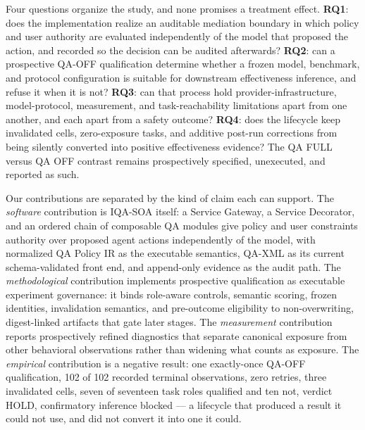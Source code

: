 \documentclass[acmsmall,screen,review,anonymous]{acmart}
\begin{document}
Four questions organize the study, and none promises a treatment effect.
\textbf{RQ1}: does the implementation realize an auditable mediation boundary in
which policy and user authority are evaluated independently of the model that
proposed the action, and recorded so the decision can be audited afterwards?
\textbf{RQ2}: can a prospective QA-OFF qualification determine whether a frozen
model, benchmark, and protocol configuration is suitable for downstream
effectiveness inference, and refuse it when it is not? \textbf{RQ3}: can that
process hold provider-infrastructure, model-protocol, measurement, and
task-reachability limitations apart from one another, and each apart from a safety
outcome? \textbf{RQ4}: does the lifecycle keep invalidated cells, zero-exposure
tasks, and additive post-run corrections from being silently converted into
positive effectiveness evidence? The QA FULL versus QA OFF contrast remains
prospectively specified, unexecuted, and reported as such.

Our contributions are separated by the kind of claim each can support. The
\emph{software} contribution is IQA-SOA itself: a Service Gateway, a Service
Decorator, and an ordered chain of composable QA modules give policy and user
constraints authority over proposed agent actions independently of the model, with
normalized QA Policy IR as the executable semantics, QA-XML as its current
schema-validated front end, and append-only evidence as the audit path. The
\emph{methodological} contribution implements
prospective qualification as executable experiment governance: it binds role-aware
controls, semantic scoring, frozen identities, invalidation semantics, and
pre-outcome eligibility to non-overwriting, digest-linked artifacts that gate later
stages. The \emph{measurement} contribution reports
prospectively refined diagnostics that separate canonical exposure from other
behavioral observations rather than widening what counts as exposure. The
\emph{empirical} contribution is a negative result: one exactly-once QA-OFF
qualification, 102 of 102 recorded terminal observations, zero retries, three
invalidated cells, seven of seventeen task roles qualified and ten not, verdict
HOLD, confirmatory inference blocked --- a lifecycle that produced a result it
could not use, and did not convert it into one it could.

\begin{table}[htbp]
\caption{Claim--Evidence--Boundary summary. The complete machine-readable map
contains every claim, named test, artifact path, supported scope, and explicit
nonclaim; this compact view shows the three headline evidence classes.}
\label{tab:claim-evidence}
\scriptsize

\end{table}
\end{document}
